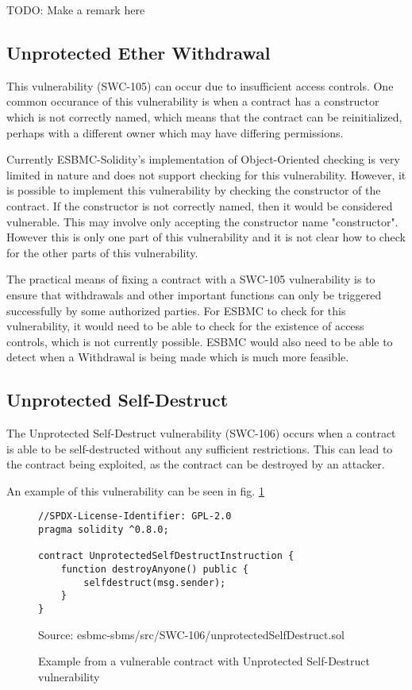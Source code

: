 TODO: Make a remark here

\subsection{Unprotected Ether Withdrawal}
\label{sec:unprotected_ether_withdrawal}

This vulnerability (SWC-105) can occur due to insufficient access controls. One common occurance of this vulnerability is when a contract has a constructor which is not correctly named, which means that the contract can be reinitialized, perhaps with a different owner which may have differing permissions.

Currently ESBMC-Solidity's implementation of Object-Oriented checking is very limited in nature and does not support checking for this vulnerability. However, it is possible to implement this vulnerability by checking the constructor of the contract. If the constructor is not correctly named, then it would be considered vulnerable. This may involve only accepting the constructor name "constructor". However this is only one part of this vulnerability and it is not clear how to check for the other parts of this vulnerability. 

The practical means of fixing a contract with a SWC-105 vulnerability is to ensure that withdrawals and other important functions can only be triggered successfully by some authorized parties. For ESBMC to check for this vulnerability, it would need to be able to check for the existence of access controls, which is not currently possible. ESBMC would also need to be able to detect when a Withdrawal is being made which is much more feasible.

\subsection{Unprotected Self-Destruct}
\label{sec:unprotected_self_destruct}

The Unprotected Self-Destruct vulnerability (SWC-106) occurs when a contract is able to be self-destructed without any sufficient restrictions. This can lead to the contract being exploited, as the contract can be destroyed by an attacker.

An example of this vulnerability can be seen in fig. \ref{fig:unprotected_self_destruct}

\begin{figure}
\begin{lstlisting}
//SPDX-License-Identifier: GPL-2.0
pragma solidity ^0.8.0;

contract UnprotectedSelfDestructInstruction {
    function destroyAnyone() public {
        selfdestruct(msg.sender);
    }
}
\end{lstlisting}
\caption{Example from a vulnerable contract with Unprotected Self-Destruct vulnerability }
Source: esbmc-sbms/src/SWC-106/unprotectedSelfDestruct.sol
\label{fig:unprotected_self_destruct}
\end{figure}

